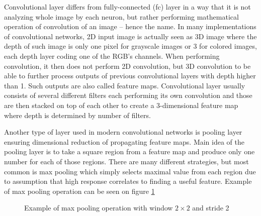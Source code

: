 Convolutional layer differs from fully-connected (fc) layer in a way that it is not analyzing whole image by each neuron, but rather performing mathematical operation of convolution of an image -- hence the name. In many implementations of convolutional networks, 2D input image is actually seen as 3D image where the depth of such image is only one pixel for grayscale images or 3 for colored images, each depth layer coding one of the RGB's channels. When performing convolution, it then does not perform 2D convolution, but 3D convolution to be able to further process outputs of previous convolutional layers with depth higher than 1. Such outputs are also called feature maps. Convolutional layer usually consists of several different filters each performing its own convolution and those are then stacked on top of each other to create a 3-dimensional feature map where depth is determined by number of filters.

Another type of layer used in modern convolutional networks is pooling layer ensuring dimensional reduction of propagating feature maps. Main idea of the pooling layer is to take a square region from a feature map and produce only one number for each of those regions. There are many different strategies, but most common is max pooling which simply selects maximal value from each region due to assumption that high response correlates to finding a useful feature. Example of max pooling operation can be seen on figure \ref{pool}

\begin{figure}
\caption{Example of max pooling operation with window $2\times2$ and stride 2}
\label{pool}
\end{figure}

